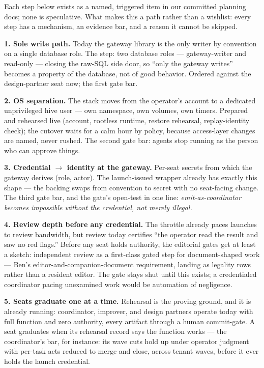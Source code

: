 Each step below exists as a named, triggered item in our committed planning docs; none is speculative. What makes this a path rather than a wishlist: every step has a mechanism, an evidence bar, and a reason it cannot be skipped.

\textbf{1. Sole write path.} Today the gateway library is the only writer by convention on a single database role. The step: two database roles --- gateway-writer and read-only --- closing the raw-SQL side door, so ``only the gateway writes'' becomes a property of the database, not of good behavior. Ordered against the design-partner seat now; the first gate bar.

\textbf{2. OS separation.} The stack moves from the operator's account to a dedicated unprivileged hive user --- own namespace, own volumes, own timers. Prepared and rehearsed live (account, rootless runtime, restore rehearsal, replay-identity check); the cutover waits for a calm hour by policy, because access-layer changes are named, never rushed. The second gate bar: agents stop running as the person who can approve things.

\textbf{3. Credential $\to$ identity at the gateway.} Per-seat secrets from which the gateway derives (role, actor). The launch-issued wrapper already has exactly this shape --- the backing swaps from convention to secret with no seat-facing change. The third gate bar, and the gate's open-test in one line: \emph{emit-as-coordinator becomes impossible without the credential, not merely illegal.}

\textbf{4. Review depth before any credential.} The throttle already paces launches to review bandwidth, but review today certifies ``the operator read the result and saw no red flags.'' Before any seat holds authority, the editorial gates get at least a sketch: independent review as a first-class gated step for document-shaped work --- Ben's editor-and-companion-document requirement, landing as legality rows rather than a resident editor. The gate stays shut until this exists; a credentialed coordinator pacing unexamined work would be automation of negligence.

\textbf{5. Seats graduate one at a time.} Rehearsal is the proving ground, and it is already running: coordinator, improver, and design partners operate today with full function and zero authority, every artifact through a human commit-gate. A seat graduates when its rehearsal record says the function works --- the coordinator's bar, for instance: its wave cuts hold up under operator judgment with per-task acts reduced to merge and close, across tenant waves, before it ever holds the launch credential.

